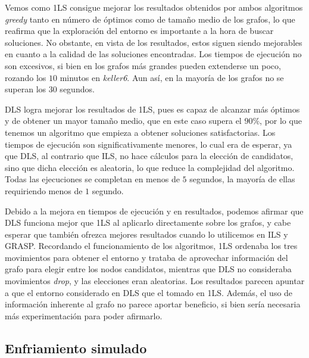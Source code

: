 Vemos como 1LS consigue mejorar los resultados obtenidos por ambos algoritmos
\textit{greedy} tanto en número de óptimos como de tamaño medio de los grafos,
lo que reafirma que la exploración del entorno es importante a la hora de buscar
soluciones. No obstante, en vista de los resultados, estos siguen siendo mejorables
en cuanto a la calidad de las soluciones encontradas. Los tiempos de ejecución no
son excesivos, si bien en los grafos más grandes pueden extenderse un poco,
rozando los $10$ minutos en \textit{keller6}. Aun así, en la mayoría de los grafos
no se superan los $30$ segundos.

DLS logra mejorar los resultados de 1LS, pues es capaz de alcanzar más óptimos
y de obtener un mayor tamaño medio, que en este caso supera el $90\%$, por lo
que tenemos un algoritmo que empieza a obtener soluciones satisfactorias.
Los tiempos de ejecución son significativamente menores, lo cual era de esperar,
ya que DLS, al contrario que ILS, no hace cálculos para la elección de candidatos,
sino que dicha elección es aleatoria, lo que reduce la complejidad del algoritmo.
Todas las ejecuciones se completan en menos de $5$ segundos, la mayoría de ellas
requiriendo menos de $1$ segundo.

Debido a la mejora en tiempos de ejecución y en resultados, podemos afirmar que
DLS funciona mejor que 1LS al aplicarlo directamente sobre los grafos, y cabe esperar
que también ofrezca mejores resultados cuando lo utilicemos en ILS y GRASP.
Recordando el funcionamiento de los algoritmos, 1LS ordenaba los tres movimientos
para obtener el entorno y trataba de aprovechar información del grafo para elegir
entre los nodos candidatos, mientras que DLS no consideraba movimientos \textit{drop},
y las elecciones eran aleatorias. Los resultados parecen apuntar a que el entorno
considerado en DLS que el tomado en 1LS. Además, el uso de información inherente
al grafo no parece aportar beneficio, si bien sería necesaria más experimentación
para poder afirmarlo.

\subsection{Enfriamiento simulado}

